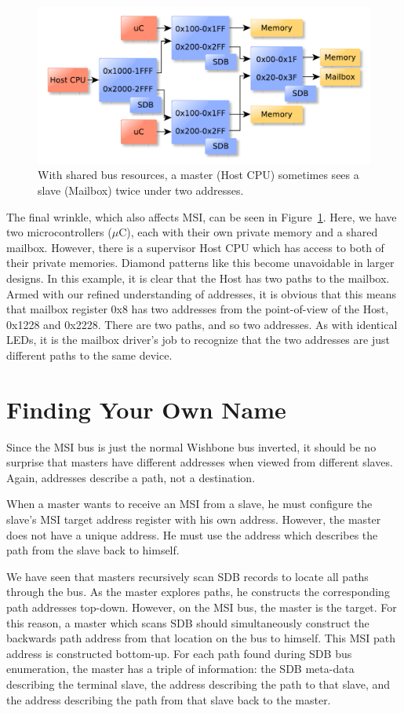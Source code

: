 \documentclass[a4paper]{jacow}
\begin{document}
\begin{figure}[t]
  \centering
  \includegraphics*[width=\columnwidth]{THHA2O03f7}
  \caption{With shared bus resources, a master (Host CPU)
  sometimes sees a slave (Mailbox) twice under two addresses.}
  \label{fig:diamond-bus}
\end{figure}

The final wrinkle, which also affects MSI, can be seen in
Figure~\ref{fig:diamond-bus}.
Here, we have two microcontrollers ($\mu$C), each with their own private
memory and a shared mailbox.
However, there is a supervisor Host CPU which has access to both of their
private memories.
Diamond patterns like this become unavoidable in larger designs.
In this example, it is clear that the Host has two paths to the mailbox.
Armed with our refined understanding of addresses, 
it is obvious that this means that mailbox register 0x8 has two addresses
from the point-of-view of the Host, 0x1228 and 0x2228.
There are two paths, and so two addresses.
As with identical LEDs, it is the mailbox driver's job to recognize that the
two addresses are just different paths to the same device.

\section{Finding Your Own Name}

Since the MSI bus is just the normal Wishbone bus inverted,
it should be no surprise that masters have different addresses when
viewed from different slaves.
Again, addresses describe a path, not a destination.

When a master wants to receive an MSI from a slave, 
he must configure the slave's MSI target address register with his own address.
However, the master does not have a unique address.
He must use the address which describes the path from the slave back to himself.

We have seen that masters recursively scan SDB records to locate all paths
through the bus.
As the master explores paths, he constructs the corresponding path addresses top-down.
However, on the MSI bus, the master is the target.
For this reason, a master which scans SDB should simultaneously construct
the backwards path address from that location on the bus to himself.
This MSI path address is constructed bottom-up.
For each path found during SDB bus enumeration,
the master has a triple of information:
the SDB meta-data describing the terminal slave,
the address describing the path to that slave,
and the address describing the path from that slave back to the master.
\end{document}
